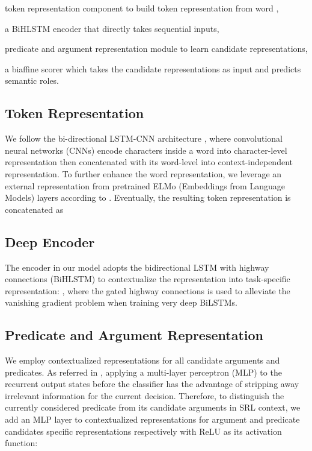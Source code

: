 \documentclass[letterpaper]{article} \usepackage{aaai19}  \usepackage{times}  \usepackage{helvet}  \usepackage{courier}  \usepackage{url}  \usepackage{graphicx}  \frenchspacing  \setlength{\pdfpagewidth}{8.5in}  \setlength{\pdfpageheight}{11in}
\begin{document}
 token representation component to build token representation  from word ,

 a BiHLSTM encoder that directly takes sequential inputs,

 predicate and argument representation module to learn candidate representations,

 a biaffine scorer which takes the candidate representations as input and predicts semantic roles.





\subsection{Token Representation}
We follow the bi-directional LSTM-CNN architecture \cite{chiu2016named}, where convolutional neural networks (CNNs) encode characters inside a word  into character-level representation  then concatenated with its word-level  into context-independent representation. To further enhance the word representation, we leverage an external representation  from pretrained ELMo (Embeddings from Language Models) layers according to \citeauthor{ELMo} . 
Eventually, the resulting token representation is concatenated as 





\subsection{Deep Encoder}

The encoder in our model adopts the bidirectional LSTM with highway connections (BiHLSTM) to contextualize the representation into task-specific representation: 
,
where the gated highway connections is used to alleviate the vanishing gradient problem when training very deep BiLSTMs.


\subsection{Predicate and Argument Representation}

We employ contextualized representations for all candidate arguments and predicates. As referred in \cite{dozat2017deep}, applying a multi-layer perceptron (MLP) to the recurrent output states before the classifier has the advantage of stripping away irrelevant information for the current decision. Therefore, to distinguish the currently considered predicate from its candidate arguments in SRL context, we add an MLP layer to contextualized representations for argument  and predicate  candidates specific representations respectively with ReLU \cite{nair2010rectified} as its activation function:
\end{document}
